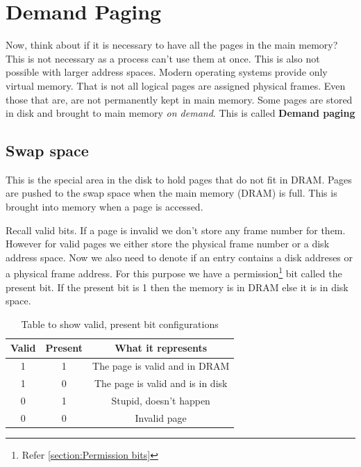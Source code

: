 \documentclass[12pt]{article}
\newcommand{\tbox}[1]{\noindent\fbox{\parbox{\textwidth}{#1}}}
\begin{document}
\noindent\tbox{
    \begin{center}
    \textbf{\Huge Lecture 16}\\
    \end{center}
}
\section{Demand Paging}
Now, think about if it is necessary to have all the pages in the main memory? This is not necessary as a process can't use them at once. This is
also not possible with larger address spaces. Modern operating systems provide only virtual memory. That is not all logical pages are assigned physical frames.
Even those that are, are not permanently kept in main memory. Some pages are stored in disk and brought to main memory \textit{on demand}. This is called 
\textbf{Demand paging}

\subsection*{Swap space}
This is the special area in the disk to hold pages that do not fit in DRAM. Pages are pushed
to the swap space when the main memory (DRAM) is full. This is brought into memory when a page is accessed.

Recall valid bits. If a page is invalid we don't store any frame number for them. However for valid pages we either store the physical frame number or 
a disk address space. Now we also need to denote if an entry contains a disk addreses or a physical frame address. For this purpose we have a permission\footnote{Refer \ref{section:Permission bits}} bit called
the present bit. If the present bit is 1 then the memory is in DRAM else it is in disk space.  

\begin{table}[h]
    \centering
    \begin{tabular}{|c|c|c|}
        \hline
        Valid & Present & What it represents\\
        \hline
        1 & 1 & The page is valid and in DRAM\\
        \hline
        1 & 0 & The page is valid and is in disk\\
        \hline
        0 & 1 & Stupid, doesn't happen\\
        \hline
        0 & 0 & Invalid page\\
        \hline
    \end{tabular}
    \caption{Table to show valid, present bit configurations}
    \label{tab:present_valid}
\end{table}
\end{document}

